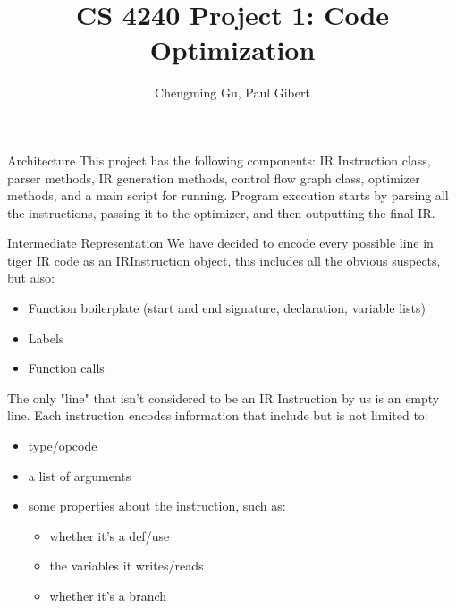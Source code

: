\documentclass[letterpaper,12pt]{article}
\theoremstyle{definition}
\begin{document}
	\title{CS 4240 Project 1: Code Optimization}
	\author{Chengming Gu, Paul Gibert}
	\maketitle

	\begin{section}{Architecture}
		This project has the following components: IR Instruction class, parser methods, IR generation methods, control flow graph class, optimizer methods, and a main script for running. Program execution starts by parsing all the instructions, passing it to the optimizer, and then outputting the final IR.
		\begin{subsection}{Intermediate Representation}
			We have decided to encode every possible line in tiger IR code as an IRInstruction object, this includes all the obvious suspects, but also:
			\begin{itemize}
				\item Function boilerplate (start and end signature, declaration, variable lists)
				\item Labels
				\item Function calls
			\end{itemize}
			The only "line" that isn't considered to be an IR Instruction by us is an empty line. Each instruction encodes information that include but is not limited to:
			\begin{itemize}
				\item type/opcode
				\item a list of arguments
				\item some properties about the instruction, such as:
					\begin{itemize}
						\item whether it's a def/use
						\item the variables it writes/reads
						\item whether it's a branch
					\end{itemize}
			\end{itemize}
		\end{subsection}


\end{section}
\end{document}
